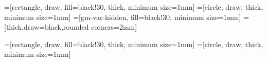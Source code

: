 \usepackage{amsmath, amssymb, amsthm}
\usepackage{hyperref, graphicx, verbatim, listings, multirow}
\usepackage{algorithm, algorithmic}

\ifx \@makeindex \@empty
\usepackage{natbib}
\fi

\usepackage{enumitem}

\usepackage{tikz}
\usetikzlibrary{arrows,decorations,fit,backgrounds}

=[rectangle, draw, fill=black!30, thick, minimum size=1mm]
=[circle, draw, thick, minimum size=1mm]
=[gm-var-hidden, fill=black!30, minimum size=1mm]
 = [thick,draw=black,rounded corners=2mm]

=[rectangle, draw, fill=black!30, thick, minimum size=1mm]
=[circle, draw, thick, minimum size=1mm]



\lstset{breaklines=true}

\setcounter{tocdepth}{3}

\makeatletter
\def\@xobeysp{ }
\makeatother

